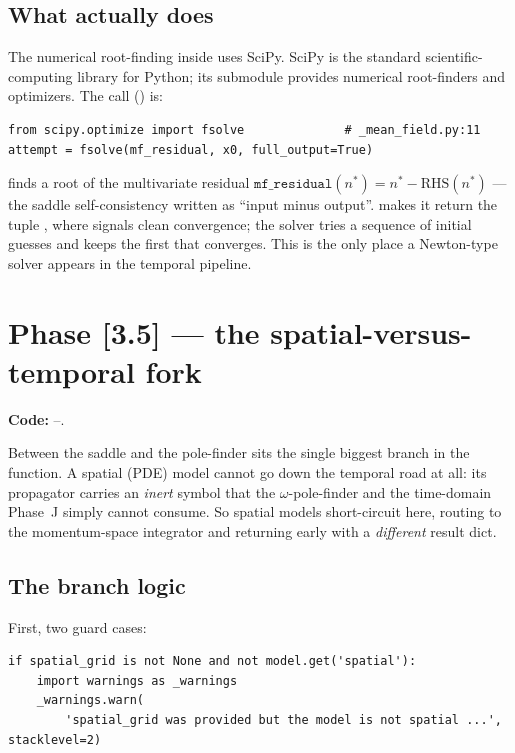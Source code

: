 \subsection{What  actually does}

The numerical root-finding inside  uses SciPy. SciPy is
the standard scientific-computing library for Python; its 
submodule provides numerical root-finders and optimizers. The call
() is:

\begin{lstlisting}
from scipy.optimize import fsolve              # _mean_field.py:11
attempt = fsolve(mf_residual, x0, full_output=True)
\end{lstlisting}

 finds a root of the multivariate residual
$\texttt{mf\_residual}(n^{*}) = n^{*} - \text{RHS}(n^{*})$ --- the saddle
self-consistency written as ``input minus output''. 
makes it return the tuple , where 
signals clean convergence; the solver tries a sequence of initial guesses and
keeps the first that converges. This is the only place a Newton-type solver
appears in the temporal pipeline.

\section{Phase [3.5] --- the spatial-versus-temporal fork}\label{sec:co-spatial}

\textbf{Code:} --.

Between the saddle and the pole-finder sits the single biggest branch in the
function. A spatial (PDE) model cannot go down the temporal road at all: its
propagator  carries an \emph{inert}  symbol that the
$\omega$-pole-finder and the time-domain Phase~J simply cannot consume. So
spatial models short-circuit here, routing to the momentum-space integrator and
returning early with a \emph{different} result dict.

\subsection{The branch logic}

First, two guard cases:

\begin{lstlisting}
if spatial_grid is not None and not model.get('spatial'):
    import warnings as _warnings
    _warnings.warn(
        'spatial_grid was provided but the model is not spatial ...', stacklevel=2)
\end{lstlisting}

